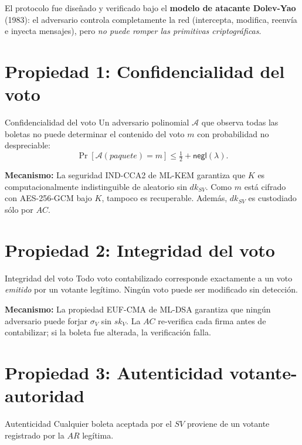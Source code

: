 \documentclass[12pt,a4paper,twoside,openright]{book}
\theoremstyle{plain}
\theoremstyle{definition}
\theoremstyle{remark}
\newcommand{\negl}{\mathsf{negl}}
\begin{document}
El protocolo fue dise\~nado y verificado bajo el \textbf{modelo de atacante
Dolev-Yao} (1983): el adversario controla completamente la red (intercepta,
modifica, reenv\'ia e inyecta mensajes), pero \emph{no puede romper las
primitivas criptogr\'aficas}.

\section{Propiedad 1: Confidencialidad del voto}

\begin{midef}{Confidencialidad del voto}
  Un adversario polinomial $\mathcal{A}$ que observa todas las boletas no
  puede determinar el contenido del voto $m$ con probabilidad no despreciable:
  \[
    \Pr[\mathcal{A}(\mathit{paquete}) = m] \leq \tfrac{1}{2} + \negl(\lambda).
  \]
\end{midef}

\textbf{Mecanismo:} La seguridad IND-CCA2 de ML-KEM garantiza que $K$ es
computacionalmente indistinguible de aleatorio sin $dk_{SV}$. Como $m$ est\'a
cifrado con AES-256-GCM bajo $K$, tampoco es recuperable. Adem\'as, $dk_{SV}$
es custodiado s\'olo por $AC$.

\section{Propiedad 2: Integridad del voto}

\begin{midef}{Integridad del voto}
  Todo voto contabilizado corresponde exactamente a un voto \emph{emitido}
  por un votante leg\'itimo. Ning\'un voto puede ser modificado sin detecci\'on.
\end{midef}

\textbf{Mecanismo:} La propiedad EUF-CMA de ML-DSA garantiza que ning\'un
adversario puede forjar $\sigma_V$ sin $sk_V$. La $AC$ re-verifica cada firma
antes de contabilizar; si la boleta fue alterada, la verificaci\'on falla.

\section{Propiedad 3: Autenticidad votante-autoridad}

\begin{midef}{Autenticidad}
  Cualquier boleta aceptada por el $SV$ proviene de un votante registrado
  por la $AR$ leg\'itima.
\end{midef}
\end{document}
